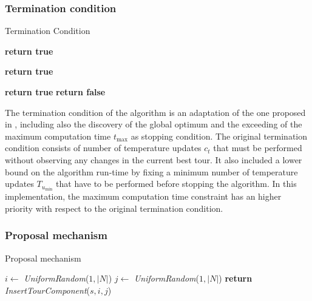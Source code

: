 \begin{homeworkProblem}

\subsubsection{Termination condition}
\begin{algorithm}[H]
  \caption{Termination Condition}\label{SA:Term}
  \begin{algorithmic}[1]
				      \State \textbf{return true}
			 \EndIf
			  
				      \State \textbf{return true}
			  \EndIf
       
				      \State \textbf{return true}
			      \EndIf
			\Else    
        \State \textbf{return false}
      \EndIf
    \EndProcedure
\end{algorithmic}
\end{algorithm}

The termination condition of the algorithm is an adaptation of the one proposed in \cite{ohlmann2007compressed}, including also the discovery of the global optimum and the exceeding of the maximum computation time $t_{\max}$ as stopping condition.
The original termination condition consists of number of temperature updates $c_t$ that must be performed without observing any changes in the current best tour.
It also included a lower bound on the algorithm run-time by fixing a minimum number of temperature updates $T_{u_{\min}}$ that have to be performed before stopping the algorithm.
In this implementation, the maximum computation time constraint has an higher priority with respect to the original termination condition.

\subsubsection{Proposal mechanism}
\begin{algorithm}[H]
\caption{Proposal mechanism}
\label{SA:Prop}
\begin{algorithmic}
  \State $i \gets $ \emph{UniformRandom}($1,|N|$)
    \State $j \gets $ \emph{UniformRandom}($1,|N|$)
  \EndWhile  
  \State \textbf{return} \emph{InsertTourComponent}($s,i,j$)   
\EndProcedure
\end{algorithmic}
\end{algorithm}


\end{homeworkProblem}
